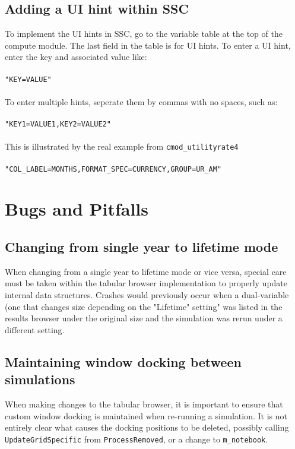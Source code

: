 \documentclass[11pt]{article} %
\begin{document}
\subsection{Adding a UI hint within SSC}
To implement the UI hints in SSC, go to the variable table at the top of the compute module.  The last field in the table is for UI hints.  To enter a UI hint, enter the key and associated value like: \\
\\
\texttt{"KEY=VALUE"} \\
\\
To enter multiple hints, seperate them by commas with no spaces, such as:\\
\\
\texttt{"KEY1=VALUE1,KEY2=VALUE2"}\\
\\
This is illustrated by the real example from \texttt{cmod\_utilityrate4}\\
\\
\texttt{"COL\_LABEL=MONTHS,FORMAT\_SPEC=CURRENCY,GROUP=UR\_AM"}

\section{Bugs and Pitfalls}
\subsection{Changing from single year to lifetime mode}
When changing from a single year to lifetime mode or vice versa, special care must be taken within the tabular browser implementation to properly update internal data structures.  Crashes would previously occur when a dual-variable (one that changes size depending on the "Lifetime" setting" was listed in the results browser under the original size and the simulation was rerun under a different setting.  
\subsection{Maintaining window docking between simulations}
When making changes to the tabular browser, it is important to ensure that custom window docking is maintained when re-running a simulation.  It is not entirely clear what causes the docking positions to be deleted, possibly calling \texttt{UpdateGridSpecific} from \texttt{ProcessRemoved}, or a change to \texttt{m\_notebook}.
\end{document}
